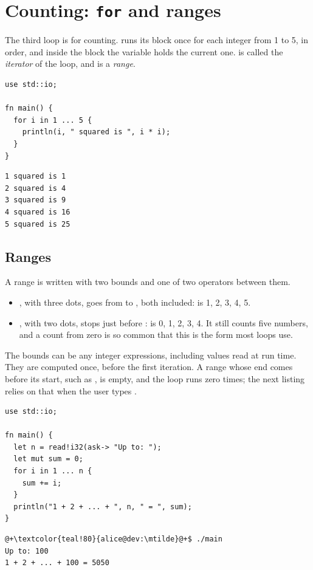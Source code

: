 \vfill\pagebreak
\section{Counting: \texttt{for} and ranges}
\label{sec:control:for}

The third loop is for counting.  runs its block
once for each integer from 1 to 5, in order, and inside the block the variable
 holds the current one.  is called the \textit{iterator} of
the loop, and  is a \textit{range}.

\begin{lstlisting}[style=coloredverbatim, caption=Counting from 1 to 5, label=lst:control:for]
use std::io;

fn main() {
  for i in 1 ... 5 {
    println(i, " squared is ", i * i);
  }
}
\end{lstlisting}
\vspace{-10pt}%
\begin{lstlisting}[style=bashVerb]
1 squared is 1
2 squared is 4
3 squared is 9
4 squared is 16
5 squared is 25
\end{lstlisting}

\subsection{Ranges}

A range is written with two bounds and one of two operators between them.

\begin{itemize}
\item {}, with three dots, goes from  to , both
  included:  is 1, 2, 3, 4, 5.
\item {}, with two dots, stops just before : 
  is 0, 1, 2, 3, 4. It still counts five numbers, and a count from zero is so
  common that this is the form most loops use.
\end{itemize}

The bounds can be any integer expressions, including values read at run time.
They are computed once, before the first iteration. A range whose end comes
before its start, such as , is empty, and the loop runs zero
times; the next listing relies on that when the user types .

\begin{lstlisting}[style=coloredverbatim, caption=A range whose end is read at run time, label=lst:control:for_sum]
use std::io;

fn main() {
  let n = read!i32(ask-> "Up to: ");
  let mut sum = 0;
  for i in 1 ... n {
    sum += i;
  }
  println("1 + 2 + ... + ", n, " = ", sum);
}
\end{lstlisting}
\vspace{-10pt}%
\begin{lstlisting}[style=bashVerb, escapechar=@+]
@+\textcolor{teal!80}{alice@dev:\mtilde}@+$ ./main
Up to: 100
1 + 2 + ... + 100 = 5050
\end{lstlisting}

